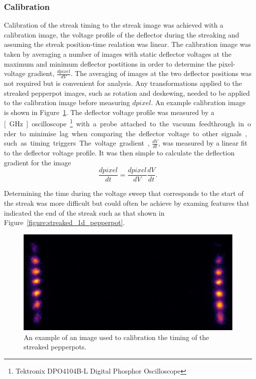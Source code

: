 \subsubsection{Calibration}
Calibration of the streak timing to the streak image was achieved with a calibration image, the voltage profile of the deflector during the streaking and assuming the streak position-time realation was linear.
The calibration image was taken by averaging a number of images with static deflector voltages at the maximum and minimum deflector postitions in order to determine the pixel-voltage gradient, $\frac{dpixel}{dV}$.
The averaging of images at the two deflector positions was not required but is convenient for analysis.
Any transformations applied to the streaked pepperpot images, such as rotation and deskewing, needed to be applied to the calibration image before measuring $dpixel$.
An example calibration image is shown in Figure~\ref{figure:example_calibration}.
The deflector voltage profile was measured by a \unit[1][GHz] oscilloscope\footnote{Tektronix DPO4104B-L Digital Phosphor Oscilloscope} with a probe attached to the vacuum feedthrough in order to minimise lag when comparing the deflector voltage to other signals, such as timing triggers.
The voltage gradient, $\frac{dV}{dt}$, was measured by a linear fit to the deflector voltage profile.
It was then simple to calculate the  deflection gradient for the image
\begin{equation}
\frac{dpixel}{dt} = \frac{dpixel}{dV} \frac{dV}{dt}.
\end{equation}

Determining the time during the voltage sweep that corresponds to the start of the streak was more difficult but could often be achieve by examing features that indicated the end of the streak such as that shown in Figure~\ref{figure:streaked_1d_pepperpot}.

\begin{figure}
    \center
    \includegraphics[width=0.5\linewidth]{part2/Figs/example_calibration.jpeg}
    \caption{An example of an image used to calibration the timing of the streaked pepperpots.}
    \label{figure:example_calibration}
\end{figure}

